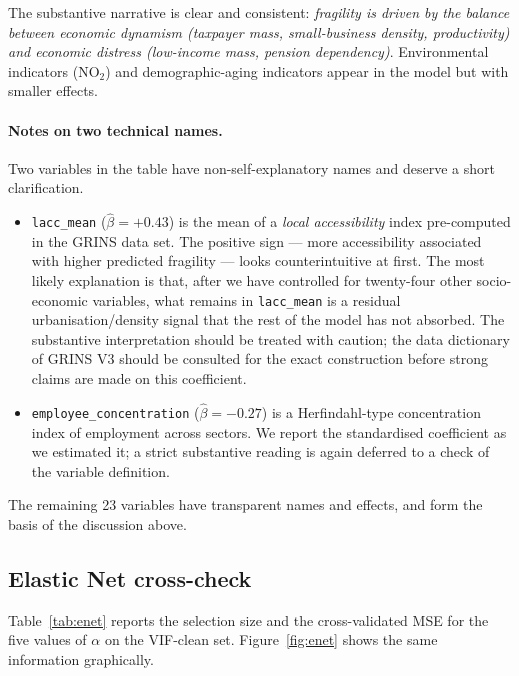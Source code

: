 \documentclass[11pt,a4paper]{article}
\begin{document}
\noindent The substantive narrative is clear and consistent:
\emph{fragility is driven by the balance between economic dynamism
(taxpayer mass, small-business density, productivity) and economic
distress (low-income mass, pension dependency)}. Environmental
indicators (\(\mathrm{NO}_{2}\)) and demographic-aging indicators
appear in the model but with smaller effects.

\paragraph{Notes on two technical names.}
Two variables in the table have non-self-explanatory names and
deserve a short clarification.
\begin{itemize}[leftmargin=2em]
  \item \texttt{lacc\_mean} (\(\hat\beta = +0.43\)) is the mean of a
    \emph{local accessibility} index pre-computed in the GRINS data
    set. The positive sign --- more accessibility associated with
    higher predicted fragility --- looks counterintuitive at first.
    The most likely explanation is that, after we have controlled for
    twenty-four other socio-economic variables, what remains in
    \texttt{lacc\_mean} is a residual urbanisation/density signal
    that the rest of the model has not absorbed. The substantive
    interpretation should be treated with caution; the data
    dictionary of GRINS V3 should be consulted for the exact
    construction before strong claims are made on this coefficient.
  \item \texttt{employee\_concentration} (\(\hat\beta = -0.27\)) is
    a Herfindahl-type concentration index of employment across
    sectors. We report the standardised coefficient as we estimated
    it; a strict substantive reading is again deferred to a check of
    the variable definition.
\end{itemize}
The remaining 23 variables have transparent names and effects, and
form the basis of the discussion above.

\subsection{Elastic Net cross-check}

Table~\ref{tab:enet} reports the selection size and the
cross-validated MSE for the five values of $\alpha$ on the
VIF-clean set. Figure~\ref{fig:enet} shows the same information
graphically.
\end{document}
